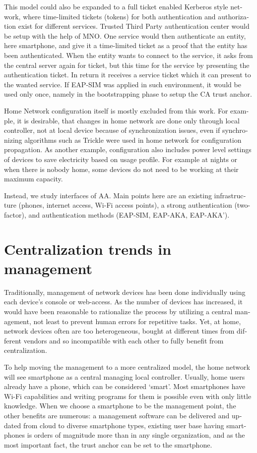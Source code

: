 \documentclass[12pt,a4paper,english]{tutthesis}
\begin{document}
\begin{otherlanguage}{english}
This model could also be expanded to a full ticket enabled
Kerberos style network, where time-limited tickets (tokens) for
both authentication and authorization exist for different services. Trusted
Third Party authentication center would be setup with the help of MNO.
One service would then authenticate an entity, here smartphone, and
give it a time-limited ticket as a proof that the entity has been authenticated.
When the entity wants to connect to the service, it asks from the central 
server again for ticket, but this time for the service by presenting
the authentication ticket. In return it receives a service ticket which
it can present to the wanted service. 
If EAP-SIM was applied in such environment, it would be used only once, namely in
the bootstrapping phase to setup the CA trust anchor.  






Home Network configuration itself is mostly excluded from this work.
For example, 
it is desirable, that changes in home network are done only through
local controller, not at local device because of
synchronization issues, even 
if synchronizing algorithms such as Trickle\cite{rfc6206} were used in
home network for configuration propagation. As another example,
configuration also includes
power level settings of devices to save electricity based on usage
profile. For example at nights or when there is nobody home, some
devices do not need to be working at their maximum capacity. 

Instead, we study interfaces of AA.  Main points here are an existing
infrastructure (phones, internet access, Wi-Fi access points),  a strong
authentication (two-factor), and authentication methods
(EAP-SIM, EAP-AKA, EAP-AKA').
\section{Centralization trends in management}
\label{sec-3-2}

Traditionally, management of network devices has been done
individually using each device's console or web-access.  As the number of
devices has increased, it would have been reasonable to rationalize
the process by utilizing a central management, not least to prevent human
errors for repetitive tasks.  Yet, at home, network devices often are
too heterogeneous, bought at different times from different vendors
and so incompatible with each other to fully benefit from
centralization. 

To help moving the management to a more centralized
model, the home network will see smartphone as a central managing local
controller.
Usually, home users already have a phone, which can be considered 
`smart'. Most smartphones have Wi-Fi capabilities and writing programs
for them is possible even with only little knowledge.
When we choose a smartphone to be the management point, the other benefits are
numerous:  a management software can be delivered and
updated from cloud to diverse smartphone types, existing user
base having smartphones is orders of magnitude more than in any single
organization, and as the most important fact, the trust anchor can be set to the smartphone.


\end{otherlanguage}
\end{document}
